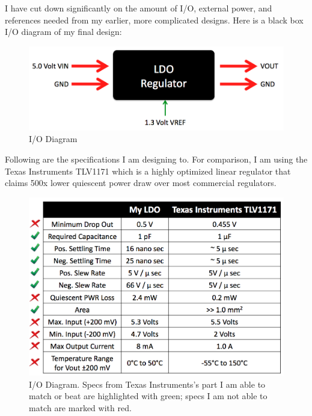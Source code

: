 \documentclass[10pt]{amsart}
\begin{document}
I have cut down significantly on the amount of I/O, external power, and references needed from my earlier, more complicated designs. Here is a black box I/O diagram of my final design: 

\begin{figure}[h]
	\begin{center}
		\includegraphics[width=6in]{Media/black.png}
	\end{center}
	\caption{I/O Diagram}
	\label{fig:black}
\end{figure}

Following are the specifications I am designing to. For comparison, I am using the Texas Instruments TLV1171 which is a highly optimized linear regulator that claims 500x lower quiescent power draw over most commercial regulators.

\begin{figure}[h]
	\begin{center}
		\includegraphics[width=6in]{Media/specs.png}
	\end{center}
	\caption{I/O Diagram. Specs from Texas Instruments's part I am able to match or beat are highlighted with green; specs I am not able to match are marked with red.}
	\label{fig:specs}
\end{figure}
\end{document}
